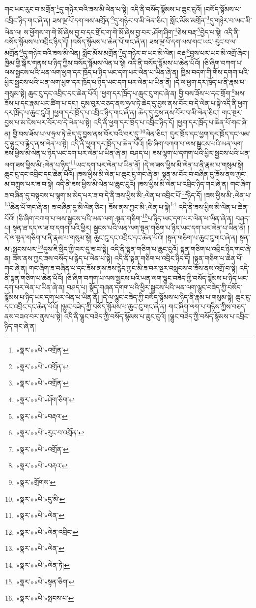 གང་ཡང་རུང་བ་མགྲོན་\footnote{«སྣར་»«པེ་»འགྲོན་}དུ་གཉེར་བའི་ཟས་མི་ལེན་པ་སྟེ། འདི་ནི་བསོད་སྙོམས་པ་ཆུང་ངུའོ། །བསོད་སྙོམས་པ་འབྲིང་ཉིད་གང་ཞེ་ན། ཟས་ལྔ་པོ་དག་ལས་མགྲོན་\footnote{«སྣར་»«པེ་»འགྲོན་}དུ་གཉེར་བ་མི་ལེན་ཅིང་། སློང་མོས་མགྲོན་\footnote{«སྣར་»«པེ་»འགྲོན་}དུ་གཉེར་བ་ཡང་མི་ལེན་ལ། ས་ཕྱོགས་ག་གེ་མོ་ཞེས་བྱ་བ་དང་གྲོང་ག་གེ་མོ་ཞེས་བྱ་བར་:ཤོག་ཤིག་\footnote{«སྣར་»«པེ་»ཤོག་ཅིག་}ཅེས་བརྡ་\footnote{«སྣར་»«པེ་»བརྡའ་}བྱེད་པ་སྟེ། འདི་ནི་བསོད་སྙོམས་པ་འབྲིང་ཉིད་དོ། །བསོད་སྙོམས་པ་ཆེན་པོ་གང་ཞེ་ན། ཟས་ལྔ་པོ་དག་ལས་གང་ཡང་:རུང་བ་ལ་མགྲོན་\footnote{«སྣར་»«པེ་»རུང་བ་འགྲོན་}དུ་གཉེར་བའི་ཟས་མི་ལེན། སློང་མོས་མགྲོན་\footnote{«སྣར་»«པེ་»འགྲོན་}དུ་གཉེར་བ་ཡང་མི་ལེན། བརྡ་\footnote{«སྣར་»«པེ་»བརྡའ་}བྱས་པར་ཡང་མི་འགྲོ་ཞིང་། ཁྱིམ་གྱི་སྒོར་གནས་པ་ཉིད་ཀྱིས་བསོད་སྙོམས་ལེན་པ་སྟེ། འདི་ནི་བསོད་སྙོམས་པ་ཆེན་པོའོ། །ཅི་ཞིག་བཀག་པ་ལས་སྦྱངས་པའི་ཡན་ལག་ཕྱག་དར་ཁྲོད་པ་ཉིད་ཡང་དག་པར་ལེན་པ་ཡིན་ཞེ་ན། ཁྱིམ་བདག་གི་གོས་དགག་པའི་ཕྱིར་སྦྱངས་པའི་ཡན་ལག་ཕྱག་དར་ཁྲོད་པ་ཉིད་ཡང་དག་པར་ལེན་པ་ཡིན་ནོ། །དེ་ལ་ཕྱག་དར་ཁྲོད་པ་ནི་རྣམ་པ་གསུམ་སྟེ། ཆུང་ངུ་དང་འབྲིང་དང་ཆེན་པོའོ། །ཕྱག་དར་ཁྲོད་པ་ཆུང་ངུ་གང་ཞེ་ན། བྱི་བས་ཟོས་པ་དང་གྲོག་\footnote{«སྣར་»གྲོགས་}མས་ཟོས་པ་དང་རྣམ་པར་ཚིག་པ་དང་། དུམ་བུར་བཅད་ནས་ཧྲལ་ཏེ་ཆེད་དུ་བྱས་ནས་བོར་བ་དེ་ལེན་པ་སྟེ་འདི་ནི་ཕྱག་དར་ཁྲོད་པ་ཆུང་ངུའོ། །ཕྱག་དར་ཁྲོད་པ་འབྲིང་ཉིད་གང་ཞེ་ན། ཆེད་དུ་བྱས་ནས་བོར་བ་མི་ལེན་ཅིང་། གང་སྔར་བྱས་པ་མ་ངེས་པར་བོར་བ་དེ་ལེན་པ་སྟེ། འདི་ནི་ཕྱག་དར་ཁྲོད་པ་འབྲིང་ཉིད་དོ། །ཕྱག་དར་ཁྲོད་པ་ཆེན་པོ་གང་ཞེ་ན། བྱི་བས་ཟོས་པ་ལ་ཧྲལ་ཏེ་ཆེད་དུ་བྱས་ནས་བོར་བའི་བར་དུ་\footnote{«སྣར་»«པེ་»དུ་མི་}ལེན་ཅིང་། དུར་ཁྲོད་དང་ཕྱག་དར་ཁྲོད་དང་ལམ་དུ་ལྷུང་བ་རྙེད་ནས་ལེན་པ་སྟེ། འདི་ནི་ཕྱག་དར་ཁྲོད་པ་ཆེན་པོའོ། །ཅི་ཞིག་བཀག་པ་ལས་སྦྱངས་པའི་ཡན་ལག་ཟས་ཕྱིས་མི་ལེན་པ་ཉིད་ཡང་དག་པར་ལེན་པ་ཡིན་ཞེ་ན། བཤད་པ། ཟས་ལྷག་པ་དགག་པའི་ཕྱིར་སྦྱངས་པའི་ཡན་ལག་ཟས་ཕྱིས་མི་:ལེན་པ་ཉིད་\footnote{«སྣར་»«པེ་»ལེན་}ཡང་དག་པར་ལེན་པ་ཡིན་ནོ། །དེ་ལ་ཟས་ཕྱིས་མི་ལེན་པ་ནི་རྣམ་པ་གསུམ་སྟེ། ཆུང་ངུ་དང་འབྲིང་དང་ཆེན་པོའོ། །ཟས་ཕྱིས་མི་ལེན་པ་ཆུང་ངུ་གང་ཞེ་ན། སྟན་མ་བོར་བ་བཞིན་དུ་ཟོས་ནས་ཀྱང་མ་བཀྲུས་པར་ཟ་བ་སྟེ། འདི་ནི་ཟས་ཕྱིས་མི་ལེན་པ་ཆུང་ངུའོ། །ཟས་ཕྱིས་མི་ལེན་པ་འབྲིང་ཉིད་གང་ཞེ་ན། གང་ཞིག་ཟ་བཞིན་དུ་བསྟབས་པ་ལྷག་མ་མེད་པར་ཟ་བ་དེ་ནི་ཟས་ཕྱིས་མི་:ལེན་པ་འབྲིང་པོ་\footnote{«སྣར་»«པེ་»ལེན་འབྲིང་}ཉིད་དོ། །ཟས་ཕྱིས་མི་:ལེན་པ་\footnote{«སྣར་»«པེ་»ལེན་}ཆེན་པོ་གང་ཞེ་ན། ཟ་བཞིན་དུ་མི་ལེན་ཅིང་། ཟོས་ནས་ཀྱང་མི་:ལེན་པ་སྟེ།\footnote{«སྣར་»«པེ་»ལེན་ཏེ།} འདི་ནི་ཟས་ཕྱིས་མི་ལེན་པ་ཆེན་པོའོ། །ཅི་ཞིག་བཀག་པ་ལས་སྦྱངས་པའི་ཡན་ལག་:སྟན་གཅིག་\footnote{«སྣར་»«པེ་»སྟན་ཅིག་}པ་ཉིད་ཡང་དག་པར་ལེན་པ་ཡིན་ཞེ་ན། བཤད་པ། སྟན་ཐ་དད་ལ་ཟ་བ་དགག་པའི་ཕྱིར། སྦྱངས་པའི་ཡན་ལག་སྟན་གཅིག་པ་ཉིད་ཡང་དག་པར་ལེན་པ་ཡིན་ནོ། །དེ་ལ་སྟན་གཅིག་པ་ནི་རྣམ་པ་གསུམ་སྟེ། ཆུང་ངུ་དང་འབྲིང་དང་ཆེན་པོའོ། །སྟན་གཅིག་པ་ཆུང་ངུ་གང་ཞེ་ན། སྟན་མ་:སྤངས་པར་\footnote{«སྣར་»«པེ་»སྤངས་པ་}དུས་ཇི་སྲིད་ཀྱི་བར་དུ་ཟ་བ་སྟེ། འདི་ནི་སྟན་གཅིག་པ་ཆུང་ངུའོ། སྟན་གཅིག་པ་འབྲིང་ཉིད་གང་ཞེ་ན། ཟོས་ནས་ཀྱང་ཟས་བསོད་པ་རྙེད་པ་ལེན་པ་སྟེ། འདི་ནི་སྟན་གཅིག་པ་འབྲིང་ཉིད་དོ། །སྟན་གཅིག་པ་ཆེན་པོ་གང་ཞེ་ན། གང་ཞིག་ཟ་བཞིན་པ་དང་ཟོས་ནས་ཟས་རྙེད་ཀྱང་མི་ཟ་བར་སྔར་བསླངས་བ་ཟོས་ནས་འགྲོ་བ་སྟེ། འདི་ནི་སྟན་གཅིག་པ་ཆེན་པོའོ། །ཅི་ཞིག་བཀག་པ་ལས་སྦྱངས་པའི་ཡན་ལག་ལྷུང་བཟེད་ཀྱི་བསོད་སྙོམས་པ་ཉིད་ཡང་དག་པར་ལེན་པ་ཡིན་ཞེ་ན། བཤད་པ། སྣོད་གཞན་དགག་པའི་ཕྱིར་སྦྱངས་པའི་ཡན་ལག་ལྷུང་བཟེད་ཀྱི་བསོད་སྙོམས་པ་ཉིད་ཡང་དག་པར་ལེན་པ་ཡིན་ནོ། །དེ་ལ་ལྷུང་བཟེད་ཀྱི་བསོད་སྙོམས་པ་ཉིད་ནི་རྣམ་པ་གསུམ་སྟེ། ཆུང་ངུ་དང་འབྲིང་དང་ཆེན་པོའོ། །ལྷུང་བཟེད་ཀྱི་བསོད་སྙོམས་པ་ཆུང་ངུ་གང་ཞེ་ན། གང་ཞིག་ལག་པ་གཉིས་ཀྱིས་བཅད་ནས་བཟའ་བར་ནུས་པ་སྟེ། འདི་ནི་ལྷུང་བཟེད་ཀྱི་བསོད་སྙོམས་པ་ཆུང་ངུའོ། །ལྷུང་བཟེད་ཀྱི་བསོད་སྙོམས་པ་འབྲིང་ཉིད་གང་ཞེ་ན། 